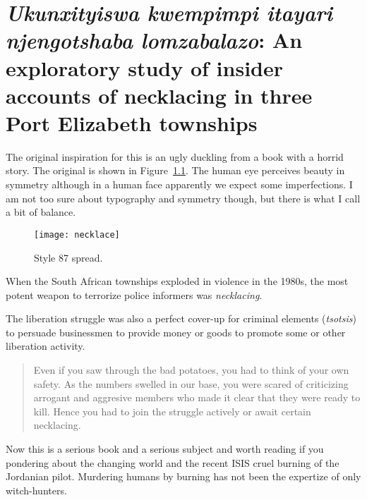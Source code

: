
\MakePercentComment

\chapter[Template 87]{{\itshape Ukunxityiswa kwempimpi itayari\\
                                 njengotshaba lomzabalazo}: An\\
                                 exploratory study of insider\\
                                 accounts of necklacing in three\\
                                 Port Elizabeth townships}
\thispagestyle{plain}
\pagestyle{headings}
The original inspiration for this is an ugly duckling from a book with a horrid story. The original is shown in Figure~\ref{necklacing}.
The human eye perceives beauty in symmetry although in a human face apparently we expect some imperfections.
I am not too sure about typography and symmetry though, but there is what I call a bit of balance. 

\begin{figure}[ht]
\centering
\texttt{[image: necklace]}
\caption{Style 87 spread.}
\label{necklacing}
\end{figure}


When the South African townships exploded in violence in the 1980s, the most potent weapon to terrorize
police informers was \emph{necklacing}. 

The liberation struggle was also a perfect cover-up for criminal elements (\emph{tsotsis}) to persuade businessmen to provide money or goods to promote some or other liberation activity. 

%

\begin{quotation}
Even if you saw through the bad potatoes, you had to think of your own safety. As the numbers swelled in our base,
you were scared of criticizing arrogant and aggresive members who made it clear that they were ready to kill. Hence you had to join the struggle actively or await certain necklacing. 
\end{quotation}

Now this is a serious book and a serious subject and worth reading if you pondering about the changing world and the recent ISIS cruel burning of the Jordanian pilot. Murdering humans by burning has not been the expertize of only witch-hunters.

